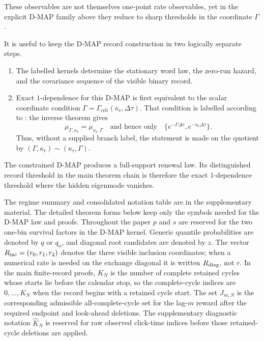 These observables are not themselves one-point rate observables, yet in the
explicit D-MAP family above they reduce to sharp thresholds in the coordinate
\(\Gamma\).

It is useful to keep the D-MAP record construction in two logically separate
steps.
\begin{enumerate}[label=\textup{(\roman*)},leftmargin=2.2em,itemsep=0.2em]
\item The labelled kernels determine the stationary word law, the zero-run
hazard, and the covariance sequence of the visible binary record.
\item Exact \(1\)-dependence for this D-MAP is first equivalent to the scalar
coordinate condition \(\Gamma=\Gamma_{\mathrm{crit}}(\kappa_{\mathrm r},\Delta\tau)\).
That condition is labelled according to :
the inverse theorem gives
\[
\mu_{\Gamma,\kappa_{\mathrm r}}=\mu_{\kappa_{\mathrm r},\Gamma}
\quad\text{and hence only}\quad
\{e^{-\Gamma\Delta\tau},e^{-\kappa_{\mathrm r}\Delta\tau}\}.
\]
Thus, without a supplied branch label, the statement is made on the quotient by
\((\Gamma,\kappa_{\mathrm r})\sim(\kappa_{\mathrm r},\Gamma)\).
\end{enumerate}
The constrained D-MAP produces a full-support renewal law.  Its distinguished
record threshold in the main theorem chain is therefore the exact
\(1\)-dependence threshold where the hidden eigenmode vanishes.

\label{tab:signatures}\label{tab:notation-global}
The regime summary and consolidated notation table are in the supplementary
material.  The detailed theorem forms below keep only the symbols needed for the
D-MAP law and proofs.  Throughout the paper \(p\) and \(s\) are reserved for
the two one-bin survival factors in the D-MAP kernel.  Generic quantile
probabilities are denoted by \(q\) or \(q_\alpha\), and diagonal root
candidates are denoted by \(z\).  The vector
\(R_{\mathrm{inc}}=(r_0,r_1,r_2)\) denotes the three visible inclusion coordinates;
when a numerical rate is needed on the exchange diagonal it is written
\(R_{\rm diag}\), not \(r\).  In the main finite-record proofs, \(K_N\) is the
number of complete retained cycles whose starts lie before the calendar stop,
so the complete-cycle indices are \(0,\ldots,K_N\) when the record begins with
a retained cycle start.  The set \(J_{m,N}\) is the corresponding admissible
all-complete-cycle set for the lag-\(m\) reward after the required endpoint
and look-ahead deletions.  The supplementary diagnostic notation
\(\widehat K_N\) is reserved for raw observed click-time indices before those
retained-cycle deletions are applied.

